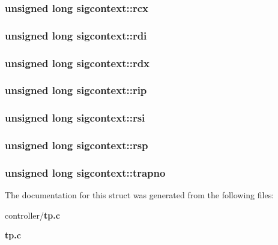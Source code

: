 \subsubsection[{rcx}]{\setlength{\rightskip}{0pt plus 5cm}unsigned long {\bf sigcontext::rcx}}\label{structsigcontext_a31e16d09c9e667fe31fe202059db607b}
\subsubsection[{rdi}]{\setlength{\rightskip}{0pt plus 5cm}unsigned long {\bf sigcontext::rdi}}\label{structsigcontext_a1fa89d1276a3d6cf215297272b55936f}
\subsubsection[{rdx}]{\setlength{\rightskip}{0pt plus 5cm}unsigned long {\bf sigcontext::rdx}}\label{structsigcontext_ab9993249b28db37789116fc65ff12d1c}
\subsubsection[{rip}]{\setlength{\rightskip}{0pt plus 5cm}unsigned long {\bf sigcontext::rip}}\label{structsigcontext_a79a3deee8af9a84e76a419da136c66c7}
\subsubsection[{rsi}]{\setlength{\rightskip}{0pt plus 5cm}unsigned long {\bf sigcontext::rsi}}\label{structsigcontext_abcff078cc70a10292b46ea5286e8ed6d}
\subsubsection[{rsp}]{\setlength{\rightskip}{0pt plus 5cm}unsigned long {\bf sigcontext::rsp}}\label{structsigcontext_a0375b9fc438cb349d76304598d4d3d08}
\subsubsection[{trapno}]{\setlength{\rightskip}{0pt plus 5cm}unsigned long {\bf sigcontext::trapno}}\label{structsigcontext_ad70cfc592e7c31683b6c76451e2e499e}


The documentation for this struct was generated from the following files:\begin{DoxyCompactItemize}
\item 
controller/{\bf tp.c}\item 
{\bf tp.c}\end{DoxyCompactItemize}
